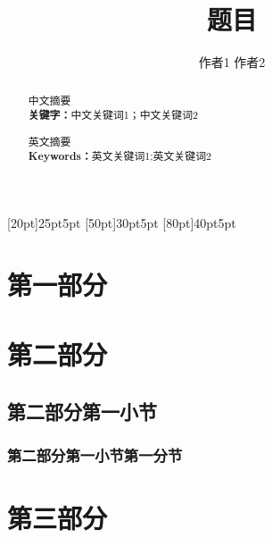 \documentclass[12pt]{article}
\begin{document}
\linespread{1.5}
\pagestyle{fancy}
\fancyhead[L, R]{}
\title{\songti {} \textbf{题目}}
\author{\fangsong {}作者1 \quad 作者2}
\date{}
\maketitle
\begin{abstract}
    \fangsong 中文摘要\\
     \textbf{\heiti 关键字：}中文关键词1；中文关键词2
\end{abstract}
\begin{abstract}
     英文摘要 \\
     \textbf{\heiti Keywords：}英文关键词1;英文关键词2
\end{abstract}
\newpage
\tableofcontents
\contentsmargin{0pt}
\renewcommand\contentspage{\thecontentspage}
[20pt]{\vspace{1mm}\bfseries\songti{}}{25pt}{5pt}
[50pt]{\vspace{1mm}\songti{}}{30pt}{5pt}
[80pt]{\vspace{1mm}\songti{}}{40pt}{5pt}
\newpage
{}
\section{\songti{}第一部分}
\section{\songti{}第二部分}
\subsection{\songti{}第二部分第一小节}
\subsubsection{\songti{}第二部分第一小节第一分节}
\section{\songti{}第三部分}
\end{document}
